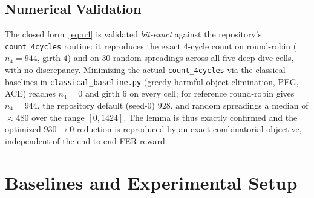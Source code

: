 \documentclass[journal]{IEEEtran}
\begin{document}
\subsection{Numerical Validation}\label{sec:lemma-num}
The closed form~\eqref{eq:n4} is validated \emph{bit-exact} against the
repository's \texttt{count\_4cycles} routine: it reproduces the exact $4$-cycle
count on round-robin ($n_4=944$, girth $4$) and on $30$ random spreadings across
all five deep-dive cells, with no discrepancy. Minimizing the actual
\texttt{count\_4cycles} via the classical baselines in
\texttt{classical\_baseline.py} (greedy harmful-object elimination, PEG, ACE)
reaches $n_4=0$ and girth $6$ on every cell; for reference round-robin gives
$n_4=944$, the repository default (seed-0) $928$, and random spreadings a median
of $\approx\!480$ over the range $[0,1424]$. The lemma is thus exactly
confirmed and the optimized $930\!\to\!0$ reduction is reproduced by an exact
combinatorial objective, independent of the end-to-end FER reward.

\section{Baselines and Experimental Setup}\label{sec:setup}
\end{document}
